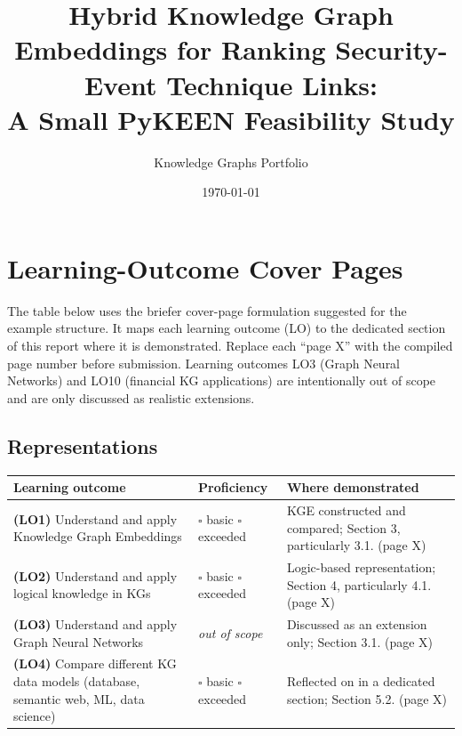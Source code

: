 \documentclass{article}
\title{Hybrid Knowledge Graph Embeddings for Ranking Security-Event Technique Links:\\ A Small PyKEEN Feasibility Study}
\author{Knowledge Graphs Portfolio}
\date{\today}
\begin{document}
\maketitle

\section*{Learning-Outcome Cover Pages}
The table below uses the briefer cover-page formulation suggested for the
example structure. It maps each learning outcome (LO) to the dedicated section
of this report where it is demonstrated. Replace each ``page X'' with the
compiled page number before submission. Learning outcomes LO3 (Graph Neural
Networks) and LO10 (financial KG applications) are intentionally out of scope
and are only discussed as realistic extensions.

\subsection*{Representations}
\begin{table}[h]
\centering
\begin{tabular}{p{4.6cm}p{3.0cm}p{4.2cm}}
\toprule
\textbf{Learning outcome} & \textbf{Proficiency} & \textbf{Where demonstrated} \\
\midrule
\textbf{(LO1)} Understand and apply Knowledge Graph Embeddings &
$\square$ basic \newline $\square$ exceeded &
KGE constructed and compared; Section 3, particularly 3.1. (page X) \\
\addlinespace
\textbf{(LO2)} Understand and apply logical knowledge in KGs &
$\square$ basic \newline $\square$ exceeded &
Logic-based representation; Section 4, particularly 4.1. (page X) \\
\addlinespace
\textbf{(LO3)} Understand and apply Graph Neural Networks &
\textit{out of scope} &
Discussed as an extension only; Section 3.1. (page X) \\
\addlinespace
\textbf{(LO4)} Compare different KG data models (database, semantic web, ML, data science) &
$\square$ basic \newline $\square$ exceeded &
Reflected on in a dedicated section; Section 5.2. (page X) \\
\bottomrule
\end{tabular}
\end{table}
\end{document}
